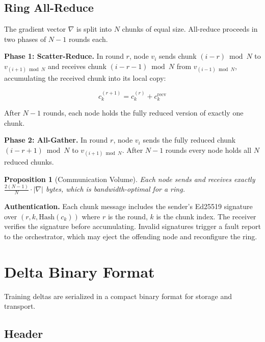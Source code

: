 \documentclass[11pt,letterpaper]{article}
\newtheorem{proposition}[theorem]{Proposition}
\begin{document}
\subsection{Ring All-Reduce}
\label{sec:allreduce}

The gradient vector $\nabla$ is split into $N$ chunks of equal size.  All-reduce proceeds in two phases of $N-1$ rounds each.

\textbf{Phase 1: Scatter-Reduce.}  In round $r$, node $v_i$ sends chunk $(i - r) \bmod N$ to $v_{(i+1) \bmod N}$ and receives chunk $(i - r - 1) \bmod N$ from $v_{(i-1) \bmod N}$, accumulating the received chunk into its local copy:

\begin{equation}
    c_k^{(r+1)} = c_k^{(r)} + c_k^{\text{recv}}
\end{equation}

After $N-1$ rounds, each node holds the fully reduced version of exactly one chunk.

\textbf{Phase 2: All-Gather.}  In round $r$, node $v_i$ sends the fully reduced chunk $(i - r + 1) \bmod N$ to $v_{(i+1) \bmod N}$.  After $N-1$ rounds every node holds all $N$ reduced chunks.

\begin{proposition}[Communication Volume]
Each node sends and receives exactly $\frac{2(N-1)}{N} \cdot |\nabla|$ bytes, which is bandwidth-optimal for a ring.
\end{proposition}

\textbf{Authentication.}  Each chunk message includes the sender's Ed25519 signature over $(r, k, \text{Hash}(c_k))$ where $r$ is the round, $k$ is the chunk index.  The receiver verifies the signature before accumulating.  Invalid signatures trigger a fault report to the orchestrator, which may eject the offending node and reconfigure the ring.

\section{Delta Binary Format}
\label{sec:delta-format}

Training deltas are serialized in a compact binary format for storage and transport.

\subsection{Header}
\end{document}
